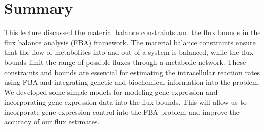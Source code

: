 \documentclass{article}[11pt]
\begin{document}
\section{Summary}
This lecture discussed the material balance constraints and the flux bounds in the flux balance analysis (FBA) framework.
The material balance constraints ensure that the flow of metabolites into and out of a system is balanced, 
while the flux bounds limit the range of possible fluxes through a metabolic network.
These constraints and bounds are essential for estimating the intracellular reaction rates using FBA and integrating genetic and biochemical information into the problem.
We developed some simple models for modeling gene expression and incorporating gene expression data into the flux bounds.
This will allow us to incorporate gene expression control into the FBA problem and improve the accuracy of our flux estimates.


\end{document}
